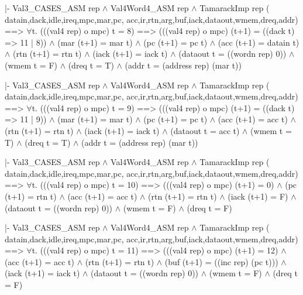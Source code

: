 \newpage %

\begintt
|- Val3_CASES_ASM rep \(\wedge\)
   Val4Word4_ASM rep \(\wedge\)
   TamarackImp rep (
     datain,dack,idle,ireq,mpc,mar,pc,
     acc,ir,rtn,arg,buf,iack,dataout,wmem,dreq,addr)
   ==>
   \(\forall\)t.
    (((val4 rep) o mpc) t = 8)
    ==>
    (((val4 rep) o mpc) (t+1) = ((dack t) => 11 | 8)) \(\wedge\)
    (mar (t+1) = mar t) \(\wedge\)
    (pc (t+1) = pc t) \(\wedge\)
    (acc (t+1) = datain t) \(\wedge\)
    (rtn (t+1) = rtn t) \(\wedge\)
    (iack (t+1) = iack t) \(\wedge\)
    (dataout t = ((wordn rep) 0)) \(\wedge\)
    (wmem t = F) \(\wedge\)
    (dreq t = T) \(\wedge\)
    (addr t = (address rep) (mar t))
\endtt

\begintt
|- Val3_CASES_ASM rep \(\wedge\)
   Val4Word4_ASM rep \(\wedge\)
   TamarackImp rep (
     datain,dack,idle,ireq,mpc,mar,pc,
     acc,ir,rtn,arg,buf,iack,dataout,wmem,dreq,addr)
   ==>
   \(\forall\)t.
    (((val4 rep) o mpc) t = 9)
    ==>
    (((val4 rep) o mpc) (t+1) = ((dack t) => 11 | 9)) \(\wedge\)
    (mar (t+1) = mar t) \(\wedge\)
    (pc (t+1) = pc t) \(\wedge\)
    (acc (t+1) = acc t) \(\wedge\)
    (rtn (t+1) = rtn t) \(\wedge\)
    (iack (t+1) = iack t) \(\wedge\)
    (dataout t = acc t) \(\wedge\)
    (wmem t = T) \(\wedge\)
    (dreq t = T) \(\wedge\)
    (addr t = (address rep) (mar t))
\endtt
\newpage %

\begintt
|- Val3_CASES_ASM rep \(\wedge\)
   Val4Word4_ASM rep \(\wedge\)
   TamarackImp rep (
     datain,dack,idle,ireq,mpc,mar,pc,
     acc,ir,rtn,arg,buf,iack,dataout,wmem,dreq,addr)
   ==>
   \(\forall\)t.
    (((val4 rep) o mpc) t = 10)
    ==>
    (((val4 rep) o mpc) (t+1) = 0) \(\wedge\)
    (pc (t+1) = rtn t) \(\wedge\)
    (acc (t+1) = acc t) \(\wedge\)
    (rtn (t+1) = rtn t) \(\wedge\)
    (iack (t+1) = F) \(\wedge\)
    (dataout t = ((wordn rep) 0)) \(\wedge\)
    (wmem t = F) \(\wedge\)
    (dreq t = F)
\endtt

\begintt
|- Val3_CASES_ASM rep \(\wedge\)
   Val4Word4_ASM rep \(\wedge\)
   TamarackImp rep (
     datain,dack,idle,ireq,mpc,mar,pc,
     acc,ir,rtn,arg,buf,iack,dataout,wmem,dreq,addr)
   ==>
   \(\forall\)t.
    (((val4 rep) o mpc) t = 11)
    ==>
    (((val4 rep) o mpc) (t+1) = 12) \(\wedge\)
    (acc (t+1) = acc t) \(\wedge\)
    (rtn (t+1) = rtn t) \(\wedge\)
    (buf (t+1) = ((inc rep) (pc t))) \(\wedge\)
    (iack (t+1) = iack t) \(\wedge\)
    (dataout t = ((wordn rep) 0)) \(\wedge\)
    (wmem t = F) \(\wedge\)
    (dreq t = F)
\endtt
\newpage %

